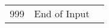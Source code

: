 \begin{landscape}
\begin{longtable}{p{3cm} p{7cm} p{11cm}}
  \hline
  999 & End of Input & \\

  \end{longtable}
\end{landscape}